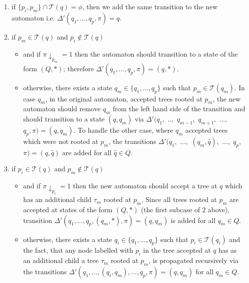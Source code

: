 \documentclass{llncs}
\begin{document}
\begin{enumerate}
\item if $\{p_i, p_m\} \cap \mathcal{T}(q) = \phi$,  then we add the same transition to the new automaton i.e. $\Delta'(q_1, ..., q_p, \pi) = q$.
\item if $p_m \in \mathcal{T}(q)$ and $p_i \notin \mathcal{T}(q)$
    \begin{itemize}
	\item and if $\pi \downarrow_{p_m} = 1$ then the automaton should transition to a state of the form $(Q,*)$; therefore $\Delta'(q_1, ..., q_p, \pi) = (q,*)$. \item otherwise, there exists a state $q_m \in \{q_1, ..., q_p\}$ such that $p_m \in \mathcal{T}(q_m)$. In case $q_m$, in the original automaton, accepted trees rooted at $p_m$, the new automaton should remove $q_m$ from the left hand side of the transition and should transition to a state $(q, q_m)$ via $\Delta'(q_1,$ $..,$ $q_{m-1},$ $q_{m+1},$ $...,$ $q_p, \pi) = (q,q_m)$. To handle the other case, where $q_m$ accepted trees which were not rooted at $p_m$, the transitions $\Delta'(q_1,$ $...,$ $(q_m,\hat{q}),$ $...,$ $q_p,$ $\pi) = (q,\hat{q})$ are added for all $\hat{q} \in Q$.
    \end{itemize}

\item if $p_i \in \mathcal{T}(q)$ and $p_m \notin \mathcal{T}(q)$
	\begin{itemize}
	\item and if $\pi \downarrow_{p_i} = 1$ then the new automaton should accept a tree at $q$ which has an additional child $\tau_m$ rooted at $p_m$. Since all trees rooted at $p_m$ are accepted at states of the form $(Q,*)$ (the first subcase of 2 above), transition $\Delta'(q_1, ..., q_p, (q_m,*), \pi) = (q, q_m)$ is added for all $q_m \in Q$.
	\item otherwise, there exists a state $q_i \in \{q_1, ..., q_p\}$ such that $p_i \in \mathcal{T}(q_i)$ and the fact, that any node labelled with $p_i$ in the tree accepted at $q$ has as an additional child a tree $\tau_m$ rooted at $p_m$, is propagated recursively via the transitions $\Delta'(q_1, ..., (q_i, q_m), ..., q_p, \pi) = (q, q_m)$ for all $q_m \in Q$. 
	\end{itemize}


\end{enumerate}
\end{document}
